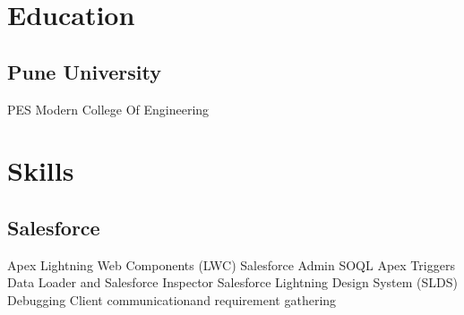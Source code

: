 \documentclass[]{resume-openfont}
\begin{document}
%
%
\lastupdated

%
%

%
%

\begin{minipage}[t]{0.33\textwidth} 


\section{Education} 

\subsection{Pune University}
PES Modern College
Of Engineering
\sectionsep





\section{Skills}
\subsection{Salesforce}

\textbullet{} Apex \newline  \textbullet{}  Lightning Web Components (LWC) \newline \textbullet{} Salesforce Admin \newline \textbullet{} SOQL \newline  \textbullet{} Apex Triggers \newline \textbullet{} Data Loader and Salesforce Inspector \newline \textbullet{} Salesforce Lightning Design System (SLDS) \newline \textbullet{} Debugging \newline \textbullet{} Client communication\newline and requirement gathering \newline \newline


\end{minipage}
\end{document}
